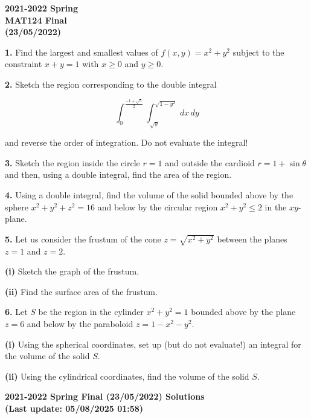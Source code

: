 \documentclass{article}
\begin{document}
\pagestyle{empty}
\large

\begin{center}
\textbf{2021-2022 Spring \\MAT124 Final\\(23/05/2022)}
\end{center}

\textbf{1.} Find the largest and smallest values of $f(x,y) = x^2+y^2$ subject to the constraint $x+y=1$ with $x\geq0$ and $y\geq0$.

\vspace{1em}

\textbf{2.} Sketch the region corresponding to the double integral

\[
    \int_0^{\frac{-1+\sqrt5}{2}}\int_{\sqrt{y}}^{\sqrt{1-y^2}}\,dx\,dy
\]

and reverse the order of integration. Do not evaluate the integral!

\vspace{1em}

\textbf{3.} Sketch the region inside the circle $r=1$ and outside the cardioid $r=1+\sin\theta$ and then, using a double integral, find the area of the region.

\vspace{1em}

\textbf{4.} Using a double integral, find the volume of the solid bounded above by the sphere $x^2+y^2+z^2 = 16$ and below by the circular region $x^2+y^2\leq2$ in the $xy$-plane.

\vspace{1em}

\textbf{5.} Let us consider the frustum of the cone $z=\sqrt{x^2+y^2}$ between the planes $z=1$ and $z=2$.

\textbf{(i)} Sketch the graph of the frustum.

\textbf{(ii)} Find the surface area of the frustum.

\vspace{1em}

\textbf{6.} Let $S$ be the region in the cylinder $x^2+y^2 = 1$ bounded above by the plane $z=6$ and below by the paraboloid $z=1-x^2-y^2$.

\textbf{(i)} Using the spherical coordinates, set up (but do not evaluate!) an integral for the volume of the solid $S$.

\textbf{(ii)} Using the cylindrical coordinates, find the volume of the solid $S$.

\newpage

\begin{center}
\textbf{2021-2022 Spring Final (23/05/2022) Solutions\\
(Last update: 05/08/2025 01:58)}
\end{center}
\end{document}
